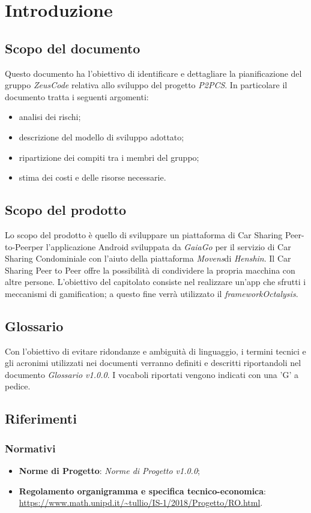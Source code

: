 \section{Introduzione}
\subsection{Scopo del documento}
Questo documento ha l'obiettivo di identificare e dettagliare la pianificazione del gruppo \textit{ZeusCode} relativa allo sviluppo del progetto \textit{P2PCS}. In particolare il documento tratta i seguenti argomenti:
\begin{itemize}
	\item analisi dei rischi;
	\item descrizione del modello di sviluppo adottato;
	\item ripartizione dei compiti tra i membri del gruppo;
	\item stima dei costi e delle risorse necessarie.
\end{itemize}
\subsection{Scopo del prodotto}
Lo scopo del prodotto è quello di sviluppare un piattaforma di Car Sharing Peer-to-Peer\glosp per l'applicazione Android sviluppata da \textit{GaiaGo} per il servizio di Car Sharing Condominiale con l'aiuto della piattaforma \textit{Movens}\glosp di \textit{Henshin}\glo. Il Car Sharing Peer to Peer offre la possibilità di condividere la propria macchina con altre persone. L'obiettivo del capitolato consiste nel realizzare un'app che sfrutti i meccanismi di gamification\glo; a questo fine
verrà utilizzato il \textit{framework}\glosp \textit{Octalysis}\glo.
\subsection{Glossario}
Con l'obiettivo di evitare ridondanze e ambiguità di linguaggio, i termini tecnici e gli acronimi
utilizzati nei documenti verranno definiti e descritti riportandoli nel documento \textit{Glossario v1.0.0}.
I vocaboli riportati vengono indicati con una 'G' a pedice.
\subsection{Riferimenti}
\subsubsection{Normativi}
\begin{itemize}
	\item \textbf{Norme di Progetto}: \textit{Norme di Progetto v1.0.0};
	\item \textbf{Regolamento organigramma e specifica tecnico-economica}: \\
	\url{https://www.math.unipd.it/~tullio/IS-1/2018/Progetto/RO.html}.
\end{itemize}

